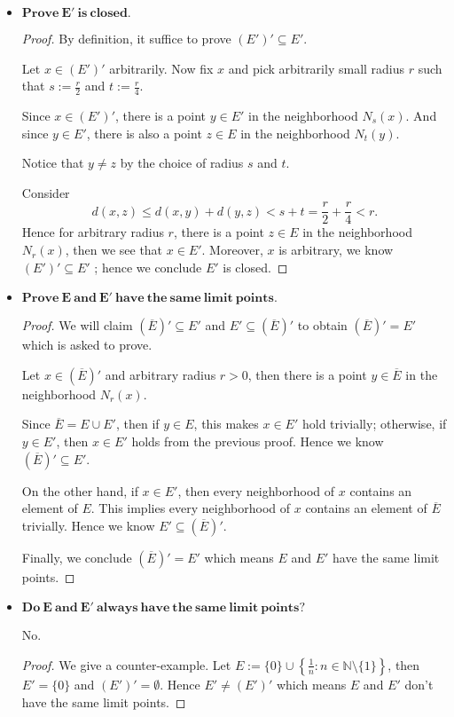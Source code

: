 \begin{Exercise}
	\begin{itemize}
		\item $\mathbf{Prove\ E'\ is\ closed.}$
		\begin{proof}
			By definition, it suffice to prove $(E')' \subseteq E'$. 
			
			Let $x\in (E')'$ arbitrarily. Now fix $x$ and pick arbitrarily small radius $r$ such that $s := \frac{r}{2}$ and $t := \frac{r}{4}$.
			
			Since $x\in (E')'$, there is a point $y\in E'$ in the neighborhood $N_s(x)$. And since $y\in E'$, there is also a point $z\in E$ in the neighborhood $N_t(y)$. 
			
			Notice that $y\neq z$ by the choice of radius $s$ and $t$.
			
			Consider
			$$
			d(x,z)
			\leq d(x,y) + d(y,z)
			< s + t
			= \frac{r}{2} + \frac{r}{4}
			< r.
			$$
			Hence for arbitrary radius $r$, there is a point $z\in E$ in the neighborhood $N_r(x)$, then we see that $x\in E'$. Moreover, $x$ is arbitrary, we know $(E')' \subseteq E'$ ; hence we conclude $E'$ is closed.
		\end{proof}
		
		\item $\mathbf{Prove\ E\ and\ E'\ have\ the\ same\ limit\ points.}$
		
		\begin{proof}
			We will claim $(\overline{E})' \subseteq E'$ and $E' \subseteq (\overline{E})'$ to obtain $(\overline{E})' = E'$ which is asked to prove.
			
			Let $x\in (\overline{E})'$ and arbitrary radius $r > 0$, then there is a point $y\in \overline{E}$ in the neighborhood $N_r(x)$.
			
			Since $\overline{E} = E\cup E'$, then if $y\in E$, this makes $x\in E'$ hold trivially; otherwise, if $y\in E'$, then $x\in E'$ holds from the previous proof. Hence we know $(\overline{E})' \subseteq E'$.
			
			On the other hand, if $x\in E'$, then every neighborhood of $x$ contains an element of $E$. This implies every neighborhood of $x$ contains an element of $\overline{E}$ trivially. Hence we know $E' \subseteq (\overline{E})'$.
			
			Finally, we conclude $(\overline{E})' = E'$ which means $E$ and $E'$ have the same limit points.
		\end{proof}
		
		\item $\mathbf{Do\ E\ and\ E'\ always\ have\ the\ same\ limit\ points?}$
		\begin{answer}
			No.
		\end{answer}
		\begin{proof}
			We give a counter-example.
			Let $E := \{0\} \cup \left\{ \frac{1}{n}:n\in\mathbb{N}\setminus\{1\} \right\}$, then $E' = \{0\}$ and $(E')' = \emptyset$. Hence $E' \neq (E')'$ which means $E$ and $E'$ don't have the same limit points.
		\end{proof}
	\end{itemize}
\end{Exercise}